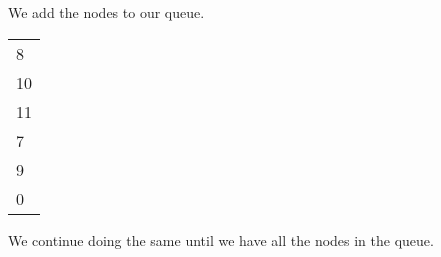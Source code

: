 We add the nodes to our queue.

\begin{table}[H]
    \centering
    \begin{tabular}{|l|}
    \hline
                              \\ \hline
    8                         \\ \hline
    10                        \\ \hline
    \rowcolor[HTML]{FFFFFF} 
    {\color[HTML]{333333} 11} \\ \hline
    \rowcolor[HTML]{FFFFFF} 
    7                         \\ \hline
    \rowcolor[HTML]{EFEFEF} 
    9                         \\ \hline
    \rowcolor[HTML]{EFEFEF} 
    0                         \\ \hline
    \end{tabular}
\end{table}

We continue doing the same until we have all the nodes in the queue.

